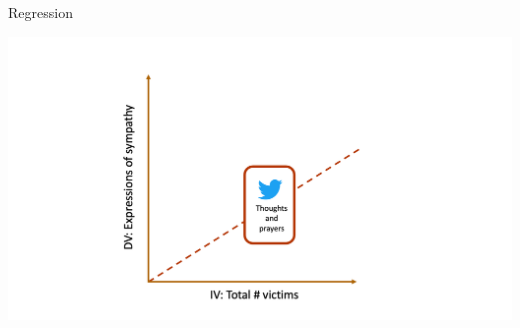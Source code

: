 \documentclass[handout]{beamer}
\begin{document}
\begin{frame}{Regression}
	
	\begin{center}
		\includegraphics{../pictures/Zhangetal_3.png} \\\
	\end{center}

	\begin{tiny}
	\end{tiny}
	
	
	
		
\end{frame}
\end{document}
